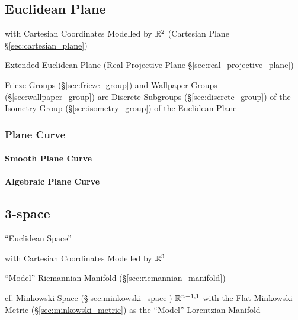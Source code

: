 \subsection{Euclidean Plane}\label{sec:euclidean_plane}

with Cartesian Coordinates Modelled by $\mathbb{R}^2$ (Cartesian Plane
\S\ref{sec:cartesian_plane})

\fist Extended Euclidean Plane (Real Projective Plane
\S\ref{sec:real_projective_plane})

Frieze Groups (\S\ref{sec:frieze_group}) and Wallpaper Groups
(\S\ref{sec:wallpaper_group}) are Discrete Subgroups
(\S\ref{sec:discrete_group}) of the Isometry Group (\S\ref{sec:isometry_group})
of the Euclidean Plane



\subsubsection{Plane Curve}\label{sec:plane_curve}

\paragraph{Smooth Plane Curve}\label{sec:smooth_plane_curve}\hfill

\paragraph{Algebraic Plane Curve}\label{sec:algebraic_plane_curve}\hfill



\subsection{3-space}\label{sec:3_space}

``Euclidean Space''

with Cartesian Coordinates Modelled by $\mathbb{R}^3$

``Model'' Riemannian Manifold (\S\ref{sec:riemannian_manifold})

cf. Minkowski Space (\S\ref{sec:minkowski_space}) $\mathbb{R}^{n-1,1}$
with the Flat Minkowski Metric (\S\ref{sec:minkowski_metric}) as the
``Model'' Lorentzian Manifold



